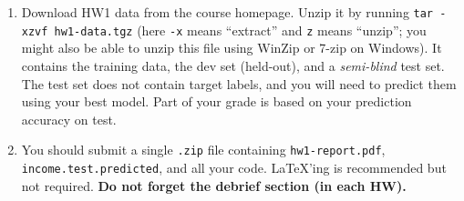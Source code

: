 \documentclass[11pt]{article}
\begin{document}
\begin{enumerate}
\item Download  HW1 data from the course homepage. Unzip it by running \verb|tar -xzvf hw1-data.tgz| (here \verb|-x| means ``extract'' and \verb|z| means ``unzip''; you might also be able to unzip this file using WinZip or 7-zip on Windows).
It contains the training data, the dev set (held-out), 
and a {\em semi-blind} test set. The test set does not contain target labels, and you will need to predict them using your best model.
Part of your grade is based on your prediction accuracy on test.
\item You should submit a single {\tt .zip} file containing {\tt hw1-report.pdf}, {\tt income.test.predicted}, and all your code.
  \LaTeX'ing is recommended but not required.
  {\bf Do not forget the debrief section (in each HW).}
\end{enumerate}
\end{document}
